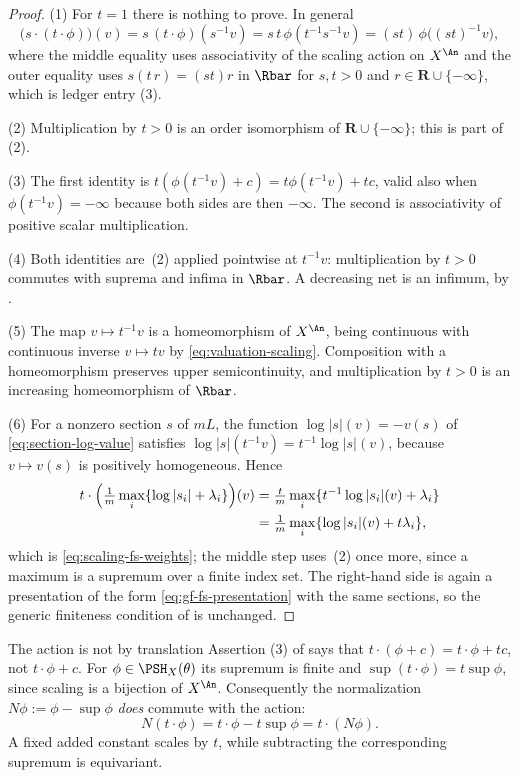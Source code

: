 \begin{proof}
(1)  For $t=1$ there is nothing to prove.  In general
\[
 \bigl(s\cdot(t\cdot\phi)\bigr)(v)
 =s\,(t\cdot\phi)(s^{-1}v)
 =s\,t\,\phi(t^{-1}s^{-1}v)
 =(st)\,\phi\bigl((st)^{-1}v\bigr),
\]
where the middle equality uses associativity of the scaling action on
$X^{\An}$ and the outer equality uses $s(t\,r)=(st)r$ in $\Rbar$ for
$s,t>0$ and $r\in\mathbf R\cup\{-\infty\}$, which is ledger entry (3).

(2)  Multiplication by $t>0$ is an order isomorphism of
$\mathbf R\cup\{-\infty\}$; this is part of
\,(2).

(3)  The first identity is
$t(\phi(t^{-1}v)+c)=t\phi(t^{-1}v)+tc$, valid also when
$\phi(t^{-1}v)=-\infty$ because both sides are then $-\infty$.  The
second is associativity of positive scalar multiplication.

(4)  Both identities are \,(2) applied
pointwise at $t^{-1}v$: multiplication by $t>0$ commutes with suprema
and infima in $\Rbar$.  A decreasing net is an infimum, by
.

(5)  The map $v\mapsto t^{-1}v$ is a homeomorphism of $X^{\An}$, being
continuous with continuous inverse $v\mapsto tv$ by
\eqref{eq:valuation-scaling}.  Composition with a homeomorphism preserves
upper semicontinuity, and multiplication by $t>0$ is an increasing
homeomorphism of $\Rbar$.

(6)  For a nonzero section $s$ of $mL$, the function
$\log|s|(v)=-v(s)$ of \eqref{eq:section-log-value} satisfies
$\log|s|(t^{-1}v)=t^{-1}\log|s|(v)$, because $v\mapsto v(s)$ is
positively homogeneous.  Hence
\[
 \begin{aligned}
 t\cdot\Bigl(\tfrac1m\max_i\{\log|s_i|+\lambda_i\}\Bigr)(v)
 &=\tfrac tm\max_i\{t^{-1}\log|s_i|(v)+\lambda_i\}\\
 &=\tfrac1m\max_i\{\log|s_i|(v)+t\lambda_i\},
 \end{aligned}
\]
which is \eqref{eq:scaling-fs-weights}; the middle step uses
\,(2) once more, since a maximum is a supremum
over a finite index set.  The right-hand side is again a presentation of the
form \eqref{eq:gf-fs-presentation} with the same sections, so the generic
finiteness condition of  is unchanged.
\end{proof}

\begin{warning}{The action is not by translation}
Assertion (3) of  says that
$t\cdot(\phi+c)=t\cdot\phi+tc$, not $t\cdot\phi+c$.  For $\phi\in\PSH_X(\theta)$ its supremum is finite and
$\sup(t\cdot\phi)=t\sup\phi$, since scaling is a bijection of
$X^{\An}$. Consequently the normalization $N\phi:=\phi-\sup\phi$
\emph{does} commute with the action:
\[
 N(t\cdot\phi)=t\cdot\phi-t\sup\phi=t\cdot(N\phi).
\]
A fixed added constant scales by $t$, while subtracting the corresponding
supremum is equivariant.
\end{warning}

